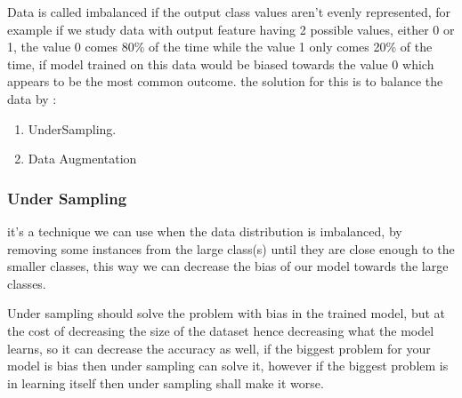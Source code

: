 Data is called imbalanced if the output class values aren't evenly represented, for example if we study data with output feature having 2 possible values, either 0 or 1, the value 0 comes 80\% of the time while the value 1 only comes 20\% of the time, if model trained on this data would be biased towards the value 0 which appears to be the most common outcome.\newline
the solution for this is to balance the data by :
\begin{enumerate}
	\item UnderSampling.
	\item Data Augmentation
\end{enumerate}
\subsubsection{Under Sampling}
it's a technique we can use when the data distribution is imbalanced, by removing some instances from the large class(s) until they are close enough to the smaller classes, this way we can decrease the bias of our model towards the large classes.\newline 

Under sampling should solve the problem with bias in the trained model, but at the cost of decreasing the size of the dataset hence decreasing what the model learns, so it can decrease the accuracy as well, if the biggest problem for your model is bias then under sampling can solve it, however if the biggest problem is in learning itself then under sampling shall make it worse.


